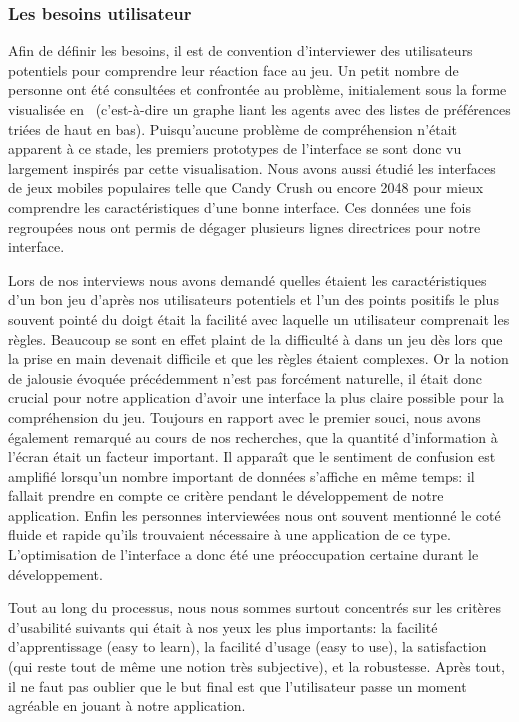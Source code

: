 \documentclass[../main.tex]{subfiles}
\begin{document}
	\subsubsection{Les besoins utilisateur}

Afin de définir les besoins, il est de convention d'interviewer des utilisateurs potentiels pour comprendre leur réaction face au jeu. Un petit nombre de personne ont été consultées et confrontée au problème, initialement sous la forme visualisée en~ (c'est-à-dire un graphe liant les agents avec des listes de préférences triées de haut en bas). Puisqu'aucune problème de compréhension n'était apparent à ce stade, les premiers prototypes de l'interface se sont donc vu largement inspirés par cette visualisation. Nous avons aussi étudié les interfaces de jeux mobiles populaires telle que Candy Crush ou encore 2048 pour mieux comprendre les caractéristiques d'une bonne interface. Ces données une fois regroupées nous ont permis de dégager plusieurs lignes directrices pour notre interface.

Lors de nos interviews nous avons demandé quelles étaient les caractéristiques d'un bon jeu d'après nos utilisateurs potentiels et l'un des points positifs le plus souvent pointé du doigt était la facilité avec laquelle un utilisateur comprenait les règles. Beaucoup se sont en effet plaint de la difficulté à  dans un jeu dès lors que la prise en main devenait difficile et que les règles étaient complexes. Or la notion de jalousie évoquée précédemment n'est pas forcément naturelle, il était donc crucial pour notre application d'avoir une interface la plus claire possible pour la compréhension du jeu. Toujours en rapport avec le premier souci, nous avons également remarqué au cours de nos recherches, que la quantité d'information à l'écran était un facteur important. Il apparaît que le sentiment de confusion est amplifié lorsqu'un nombre important de données s'affiche en même temps: il fallait prendre en compte ce critère pendant le développement de notre application. Enfin les personnes interviewées nous ont souvent mentionné le coté fluide et rapide qu'ils trouvaient nécessaire à une application de ce type. L'optimisation de l'interface a donc été une préoccupation certaine durant le développement.

Tout au long du processus, nous nous sommes surtout concentrés sur les critères d'usabilité suivants qui était à nos yeux les plus importants: la facilité d'apprentissage (easy to learn), la facilité d'usage (easy to use), la satisfaction (qui reste tout de même une notion très subjective), et la robustesse. Après tout, il ne faut pas oublier que le but final est que l'utilisateur passe un moment agréable en jouant à notre application.
\end{document}
